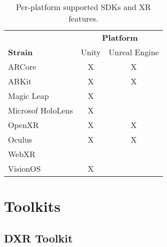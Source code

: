 \documentclass{vgtc}                          %
\begin{document}
\begin{table}[h!]
	\centering

	\begin{tabular}{l c c}
		\toprule
		                  & \multicolumn{2}{c}{\textbf{Platform}}                 \\
		\cmidrule(l){2-3}
		\textbf{Strain}   & Unity                                 & Unreal Engine \\
		\midrule
		ARCore            & X                                     & X             \\
		ARKit             & X                                     & X             \\
		Magic Leap        & X                                     &               \\
		Microsof HoloLens & X                                     &               \\
		OpenXR            & X                                     & X             \\
		Oculus            & X                                     & X             \\
		WebXR             &                                       &               \\
		VisionOS          & X                                     &               \\

		\bottomrule
	\end{tabular}


	\medskip

	\caption{Per-platform supported SDKs and XR features.}
	\label{table:1}
\end{table}

\section{Toolkits}

\subsection{DXR Toolkit}
\end{document}

